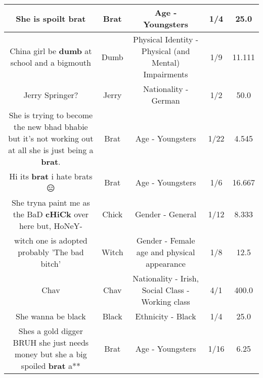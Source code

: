 \documentclass[11pt]{article}
\newlength\mylength
\begin{document}
\begin{center}
\begin{longtable}{|C{.65\mylength}|C{.30\mylength}|C{.12\mylength}|C{.12\mylength}|C{.12\mylength}|}
  \small She is spoilt brat\normalsize   & Brat & Age - Youngsters & 1/4 & 25.0 \\  \hline
  \small China girl be \textbf{dumb} at school and a bigmouth\normalsize   & Dumb & Physical Identity - Physical (and Mental) Impairments & 1/9 & 11.111 \\  \hline
  \small Jerry Springer?\normalsize   & Jerry & Nationality - German & 1/2 & 50.0 \\  \hline
  \small She is trying to become the new bhad bhabie but it's not working out at all she is just being a \textbf{brat}.\normalsize   & Brat & Age - Youngsters & 1/22 & 4.545 \\  \hline
  \small Hi its \textbf{brat} i hate brats😑\normalsize   & Brat & Age - Youngsters & 1/6 & 16.667 \\  \hline
  \small She tryna paint me as the BaD \textbf{cHiCk} over here but, HoNeY-\normalsize   & Chick & Gender - General & 1/12 & 8.333 \\  \hline
  \small witch one is adopted probably   'The bad bitch'\normalsize   & Witch & Gender - Female age and physical appearance & 1/8 & 12.5 \\  \hline
  \small Chav\normalsize   & Chav & Nationality - Irish, Social Class - Working class & 4/1 & 400.0 \\  \hline
  \small She wanna be black\normalsize   & Black & Ethnicity - Black & 1/4 & 25.0 \\  \hline
  \small Shes a gold digger BRUH she just needs money but she a big spoiled \textbf{brat} a**\normalsize   & Brat & Age - Youngsters & 1/16 & 6.25 \\  \hline

\end{longtable}
\end{center}
\end{document}
